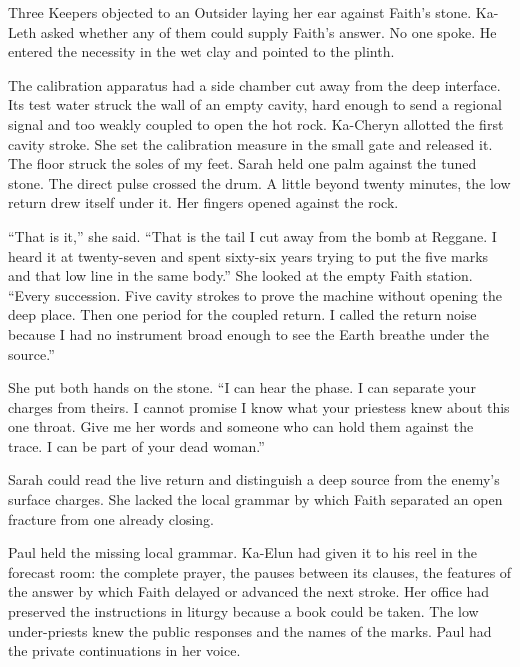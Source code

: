 Three Keepers objected to an Outsider laying her ear against Faith's stone. Ka-Leth asked whether any of them could supply Faith's answer. No one spoke. He entered the necessity in the wet clay and pointed to the plinth.\par

The calibration apparatus had a side chamber cut away from the deep interface. Its test water struck the wall of an empty cavity, hard enough to send a regional signal and too weakly coupled to open the hot rock. Ka-Cheryn allotted the first cavity stroke. She set the calibration measure in the small gate and released it. The floor struck the soles of my feet. Sarah held one palm against the tuned stone. The direct pulse crossed the drum. A little beyond twenty minutes, the low return drew itself under it. Her fingers opened against the rock.\par

``That is it,'' she said. ``That is the tail I cut away from the bomb at Reggane. I heard it at twenty-seven and spent sixty-six years trying to put the five marks and that low line in the same body.'' She looked at the empty Faith station. ``Every succession. Five cavity strokes to prove the machine without opening the deep place. Then one period for the coupled return. I called the return noise because I had no instrument broad enough to see the Earth breathe under the source.''\par

She put both hands on the stone. ``I can hear the phase. I can separate your charges from theirs. I cannot promise I know what your priestess knew about this one throat. Give me her words and someone who can hold them against the trace. I can be part of your dead woman.''\par

\ornament

Sarah could read the live return and distinguish a deep source from the enemy's surface charges. She lacked the local grammar by which Faith separated an open fracture from one already closing.\par

Paul held the missing local grammar. Ka-Elun had given it to his reel in the forecast room: the complete prayer, the pauses between its clauses, the features of the answer by which Faith delayed or advanced the next stroke. Her office had preserved the instructions in liturgy because a book could be taken. The low under-priests knew the public responses and the names of the marks. Paul had the private continuations in her voice.\par

